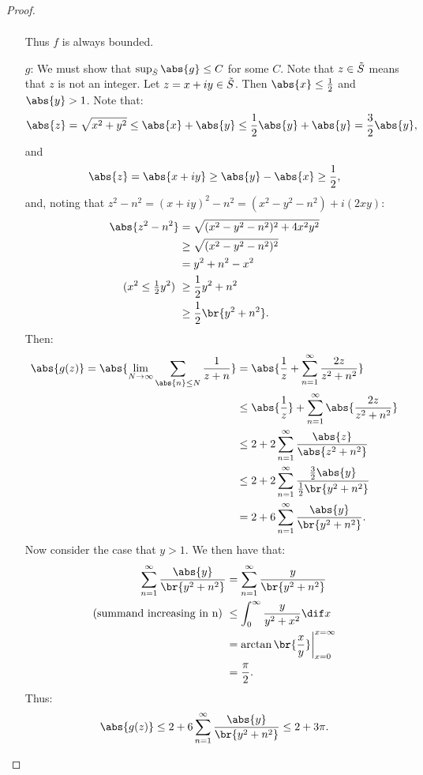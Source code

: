 \begin{proof}
\begin{enumerate}
\begin{align*}
    \end{align*}
    Thus $f$ is always bounded.
    \item[$g$:] We must show that $\sup_{\Tilde{S}} \abs{g} \leq C $ for some $C$. Note that $z \in \Tilde{S}$ means that $z$ is not an integer. Let $z = x+iy \in \Tilde{S}$. Then $\abs{x} \leq \frac{1}{2}$ and $\abs{y} > 1$. Note that:
    \begin{align*}
        \abs{z} = \sqrt{x^2 + y^2} \leq \abs{x} + \abs{y} \leq \frac{1}{2}\abs{y} + \abs{y} = \frac{3}{2} \abs{y},
    \end{align*}
    and
    \begin{align*}
        \abs{z} = \abs{x+iy} \geq \abs{y} - \abs{x} \geq \frac{1}{2},
    \end{align*}
    and, noting that $z^2-n^2 = (x+iy)^2 -n^2 = (x^2 - y^2 -n^2) + i(2 xy)$:
    \begin{align*}
        \abs{z^2 - n^2} &= \sqrt{(x^2 - y^2 -n^2)^2 + 4 x^2y^2}\\ &\geq \sqrt{(x^2 - y^2 -n^2)^2}\\
        &= y^2 + n^2 - x^2\\
        \text{($x^2\leq \tfrac{1}{2}y^2$) } &\geq \frac{1}{2} y^2 + n^2\\
        &\geq \frac{1}{2} \br{y^2 + n^2}.
    \end{align*}
    Then:
    \begin{align*}
        \abs{g(z)} = \abs{\lim_{N \to \infty } \sum_{\abs{n } \leq N} \frac{1}{z+n}} &= \abs{\frac{1}{z} + \sum_{n=1}^\infty \frac{2z}{z^2+n^2}}\\
        &\leq \abs{\frac{1}{z}} + \sum_{n=1}^\infty \abs{\frac{2z}{z^2+n^2}}\\
        &\leq 2 + 2 \sum_{n=1}^\infty \frac{\abs{z}}{\abs{z^2 + n^2}}\\
        &\leq 2 + 2 \sum_{n=1}^\infty \frac{\frac{3}{2}\abs{y}}{\frac{1}{2} \br{y^2 + n^2}}\\
        &= 2 + 6 \sum_{n=1}^\infty \frac{\abs{y}}{ \br{y^2 + n^2}}.
    \end{align*}
Now consider the case that $y>1$. We then have that:
\begin{align*}
    \sum_{n=1}^\infty \frac{\abs{y}}{ \br{y^2 + n^2}} &= \sum_{n=1}^\infty \frac{y}{ \br{y^2 + n^2}}\\
    \text{(summand increasing in n) }&\leq \int_{0}^\infty \frac{y}{y^2+x^2} \dif x\\
    &= \arctan\br{\frac{x}{y}}\bigg|_{x=0}^{x= \infty}\\ &= \frac{\pi}{2}.
\end{align*}
Thus:
\begin{align*}
    \abs{g(z)} \leq 2 + 6 \sum_{n=1}^\infty \frac{\abs{y}}{ \br{y^2 + n^2}} \leq 2 + 3 \pi.
\end{align*}


\end{enumerate}
\end{proof}
